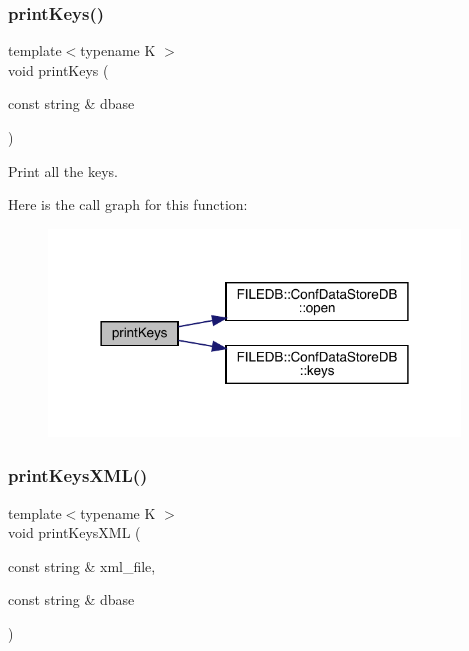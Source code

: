 \subsubsection{\texorpdfstring{printKeys()}{printKeys()}}
{\footnotesize\ttfamily template$<$typename K $>$ \\
void print\+Keys (\begin{DoxyParamCaption}\item[{const string \&}]{dbase }\end{DoxyParamCaption})}



Print all the keys. 

Here is the call graph for this function\+:
\nopagebreak
\begin{figure}[H]
\begin{center}
\leavevmode
\includegraphics[width=310pt]{db/d54/adat-devel_2main_2dbutil_2dbdisco_8cc_a05c6483ffb9fa71112b451a5dd7eb935_cgraph}
\end{center}
\end{figure}
\mbox{\label{adat-devel_2main_2dbutil_2dbdisco_8cc_a44428d59560cb466420c5c0ca60315e5}} 
\subsubsection{\texorpdfstring{printKeysXML()}{printKeysXML()}}
{\footnotesize\ttfamily template$<$typename K $>$ \\
void print\+Keys\+X\+ML (\begin{DoxyParamCaption}\item[{const string \&}]{xml\+\_\+file,  }\item[{const string \&}]{dbase }\end{DoxyParamCaption})}



